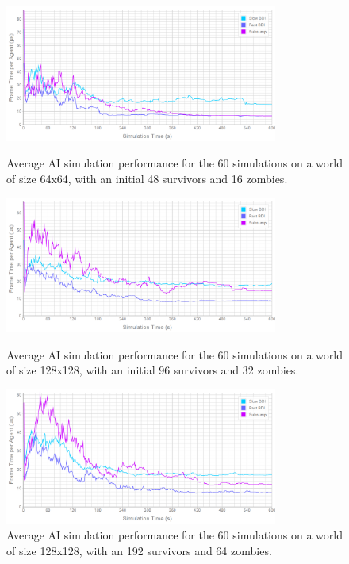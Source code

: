 \documentclass[a4paper,12pt]{article}
\begin{document}
\begin{figure}
\vspace{-20mm}
\centering
\includegraphics[width=0.8\textwidth]{../../Results/64_48_16/performance}
\caption{\small Average AI simulation performance for the 60 simulations on a world of size 64x64, with an initial 48 survivors and 16 zombies.}
\label{fig:64_48_16_per}

\vspace{5mm}
\includegraphics[width=0.8\textwidth]{../../Results/128_96_32/performance}
\caption{\small Average AI simulation performance for the 60 simulations on a world of size 128x128, with an initial 96 survivors and 32 zombies.}
\label{fig:64_96_32_per}

\vspace{5mm}
\includegraphics[width=0.8\textwidth]{../../Results/128_192_64/performance}
\caption{\small Average AI simulation performance for the 60 simulations on a world of size 128x128, with an 192 survivors and 64 zombies.}
\label{fig:128_192_64_per}
\end{figure}
\end{document}

